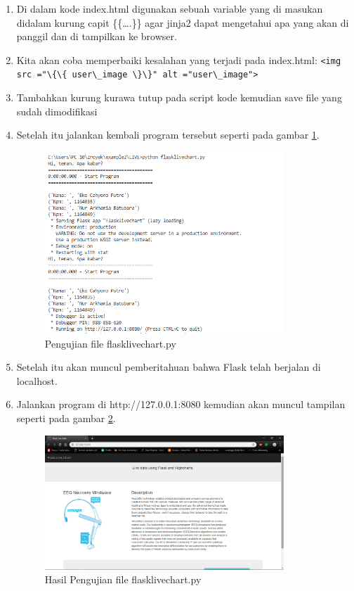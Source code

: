 \begin{enumerate}
\item Di dalam kode index.html digunakan sebuah variable yang di masukan didalam kurung capit \{\{….\}\} agar jinja2 dapat mengetahui apa yang akan di panggil dan di tampilkan ke browser.
\item Kita akan coba memperbaiki kesalahan yang terjadi pada index.html:
\verb|<img src ="\{\{ user\_image \}\}" alt ="user\_image">|
\item Tambahkan kurung kurawa tutup pada script kode kemudian save file yang sudah dimodifikasi
\item Setelah itu jalankan kembali program tersebut seperti pada gambar \ref{fig:ujif}.
\begin{figure}[!htbp]
	\centerline{\includegraphics[width=0.85\textwidth]{figures/13/ujif.PNG}}
	\caption{Pengujian file flasklivechart.py}
	\label{fig:ujif}
\end{figure}

\item Setelah itu akan muncul pemberitahuan bahwa Flask telah berjalan di localhost.
\item Jalankan program di http://127.0.0.1:8080 kemudian akan muncul tampilan seperti pada gambar \ref{fig:huji}.
\begin{figure}[!htbp]
	\centerline{\includegraphics[width=0.85\textwidth]{figures/13/huji.PNG}}
	\caption{Hasil Pengujian file flasklivechart.py}
	\label{fig:huji}
\end{figure}


\end{enumerate}
